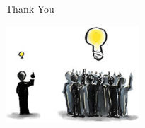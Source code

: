 \documentclass[xcolor=dvipsnames,beamer]{beamer} %
\begin{document}
\begin{frame}[fragile]{Thank You}

\begin{center}
 \includegraphics[width=5cm]{crowdsourcing}
\end{center}

\end{frame}
\end{document}
